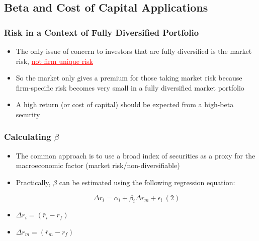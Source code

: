 \documentclass[9pt,aspectratio=169]{beamer}
\begin{document}


\subsection{Beta and Cost of Capital Applications}


\begin{frame}

\frametitle{\textnormal{Risk in a Context of Fully Diversified Portfolio}}

\begin{itemize}

\item The only issue of concern to investors that are fully diversified is the market risk, \textcolor{red}{\underline{not firm unique risk}}

\item So the market only gives a premium for those taking market risk because firm-specific risk becomes very small in a fully diversified market portfolio

\item A high return (or cost of capital) should be expected from a high-beta security


\end{itemize}

\end{frame}


\begin{frame}

\frametitle{\textnormal{Calculating $\beta$}}

\begin{itemize}
    \item The common approach is to use a broad index of securities as a proxy for the macroeconomic factor (market risk/non-diversifiable)
    
\item Practically, $\beta$ can be estimated using the following regression equation:

$$
\Delta r_i = \alpha_i + \beta_i \Delta r_m + \epsilon_i  \ (2) $$

\item $\Delta r_i = (\bar{r}_i - r_f)$

\item $\Delta r_m = (\bar{r}_m - r_f)$

\end{itemize}

\end{frame}
\end{document}
